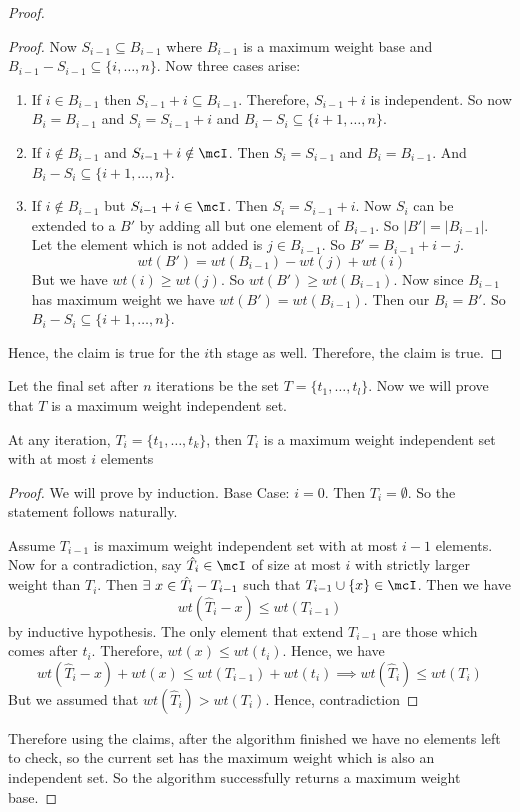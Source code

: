 \begin{proof}
\begin{claimwidth}
\begin{proof}
	Now $S_{i-1}\subseteq B_{i-1}$ where $B_{i-1}$ is a maximum weight base and $B_{i-1}-S_{i-1}\subseteq \{i,\dots, n\}$. Now three cases arise:
	\begin{enumerate}[label=\bfseries Case \arabic*:,leftmargin=1.5cm]
		\item If $i\in B_{i-1}$ then $S_{i-1}+i\subseteq B_{i-1}$. Therefore, $S_{i-1}+i$ is independent. So now $B_i=B_{i-1}$ and $S_i=S_{i-1}+i$ and $B_i-S_i\subseteq \{i+1,\dots, n\}$.
		\item If $i\notin B_{i-1}$ and $S_{i-1}+i\notin \mcI$. Then $S_i=S_{i-1}$ and $B_i=B_{i-1}$. And $B_i-S_i\subseteq \{i+1,\dots , n\}$.
		\item If $i\notin B_{i-1}$ but $S_{i-1}+i\in \mcI$. Then $S_i=S_{i-1}+i$. Now $S_i$ can be extended to a $B'$ by adding all but one element of $B_{i-1}$. So $|B'|=|B_{i-1}|$. Let the element which is not added is $j\in B_{i-1}$. So $B'=B_{i-1}+i-j$. $$wt(B')=wt(B_{i-1})-wt(j)+wt(i)$$But we have $wt(i)\geq wt(j)$. So $wt(B')\geq wt(B_{i-1})$. Now since $B_{i-1}$ has maximum weight we have $wt(B')=wt(B_{i-1})$. Then our $B_i=B'$. So $B_i-S_i\subseteq \{i+1,\dots, n\}$.
	\end{enumerate}
	Hence, the claim is true for the $i$th stage as well. Therefore, the claim is true.
\end{proof}
\end{claimwidth}
Let the final set after $n$ iterations be the set $T=\{t_1,\dots, t_l\}$. Now we will prove that $T$ is a maximum weight independent set.
\begin{claimwidth}
	\begin{claim}{}{}
	At any iteration, $T_i=\{t_1,\dots, t_k\}$, then $T_i$ is a maximum weight independent set with at most $i$ elements
\end{claim}
\begin{proof}
	We will prove by induction. Base Case: $i=0$. Then $T_i=\emptyset$. So the statement follows naturally.
	
	Assume $T_{i-1}$ is maximum weight independent set with at most $i-1$ elements. Now for a contradiction, say $\hat{T}_i\in\mcI$ of size at most $i$ with strictly larger weight than $T_i$. Then $\exists\ x\in \hat{T_i}-T_{i-1}$ such that $T_{i-1}\cup \{x\}\in \mcI$. Then we have $$wt(\hat{T}_i-x)\leq wt(T_{i-1})$$by inductive hypothesis. The only element that extend $T_{i-1}$ are those which comes after $t_{i}$. Therefore, $wt(x)\leq wt(t_i)$. Hence, we have $$wt(\hat{T}_i-x)+wt(x)\leq wt(T_{i-1})+wt(t_i)\implies wt(\hat{T}_i)\leq wt(T_i)$$But we assumed that $wt(\hat{T}_i)>wt(T_i)$. Hence, contradiction \ctr
\end{proof}
\end{claimwidth}

	\parinn 
	
	Therefore using the claims, after the algorithm finished we have no elements left to check, so the current set has the maximum weight which is also an independent set. So the algorithm successfully returns a maximum weight base.
\end{proof}
